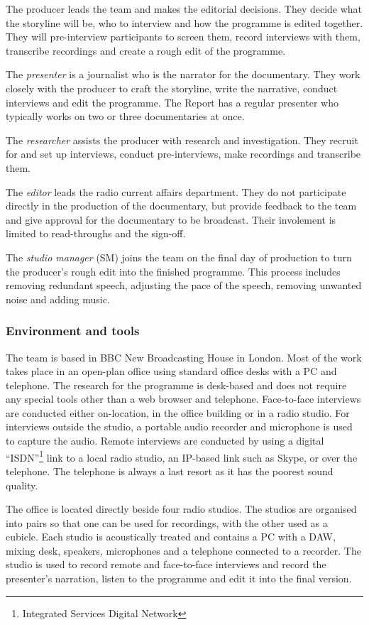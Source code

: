 The producer leads the team and makes the editorial decisions. They decide what the storyline will be, who to interview
and how the programme is edited together. They will pre-interview participants to screen them, record interviews with
them, transcribe recordings and create a rough edit of the programme.

The \textit{presenter} is a journalist who is the narrator for the documentary. They work closely with the producer to
craft the storyline, write the narrative, conduct interviews and edit the programme. The Report has a regular
presenter who typically works on two or three documentaries at once.

The \textit{researcher} assists the producer with research and investigation. They recruit for and set up interviews,
conduct pre-interviews, make recordings and transcribe them. 

The \textit{editor} leads the radio current affairs department. They do not participate directly in the production of
the documentary, but provide feedback to the team and give approval for the documentary to be broadcast.  Their
involement is limited to read-throughs and the sign-off.

The \textit{studio manager} (SM) joins the team on the final day of production to turn the producer's rough edit into
the finished programme. This process includes removing redundant speech, adjusting the pace of the speech, removing
unwanted noise and adding music.

\subsubsection{Environment and tools}
The team is based in BBC New Broadcasting House in London. Most of the work takes place in an open-plan office using
standard office desks with a PC and telephone. The research for the programme is desk-based and does not require any
special tools other than a web browser and telephone.  Face-to-face interviews are conducted either on-location, in the
office building or in a radio studio.  For interviews outside the studio, a portable audio recorder and microphone is
used to capture the audio.  Remote interviews are conducted by using a digital ``ISDN''\footnote{Integrated Services
Digital Network} link to a local radio studio, an IP-based link such as Skype, or over the telephone. The telephone is
always a last resort as it has the poorest sound quality.

The office is located directly beside four radio studios. The studios are organised into pairs so that one can be used
for recordings, with the other used as a cubicle. Each studio is acoustically treated and contains a PC with a DAW,
mixing desk, speakers, microphones and a telephone connected to a recorder. The studio is used to record remote and
face-to-face interviews and record the presenter's narration, listen to the programme and edit it into the final
version.

